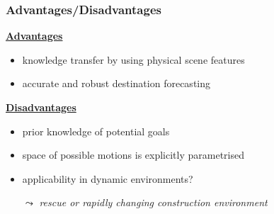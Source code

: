 \begin{frame}
	\frametitle{Advantages/Disadvantages}
	
	\Large
	
	\vspace{0.6cm}
	
	\underline{\textbf{Advantages}} \\
	
	\vspace{0.2cm}
	
	\begin{itemize}
		\item knowledge transfer by using physical scene features
		\item accurate and robust destination forecasting
	\end{itemize}
	
	\vspace{0.2cm}
	
	\underline{\textbf{Disadvantages}} \\
	
	\vspace{0.19cm}
	
	\begin{itemize}
		\item prior knowledge of potential goals
		\item space of possible motions is explicitly parametrised
		\item applicability in dynamic environments? \\
			  \vspace{-0.2cm}
			  \begin{tabbing}
				  \hspace{0.3cm}
				  \large
				  $ \leadsto $ \emph{rescue or rapidly changing construction environment}
			  \end{tabbing}
	\end{itemize}
\end{frame}
